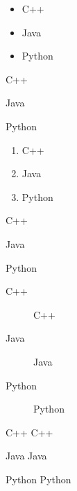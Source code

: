 \documentclass[12pt]{article}
\begin{document}
        \renewcommand{\labelitemi}{*}   %
        \renewcommand{\theenumi}{\Roman{enumi}} %
        \begin{itemize} %
            \item C++
            \item Java
            \item Python
        \end{itemize}
        \begin{compactitem}
            \item C++
            \item Java
            \item Python
        \end{compactitem}  
                
        \begin{enumerate}
            \item C++
            \item Java
            \item Python
        \end{enumerate}
        \begin{compactenum}
            \item C++
            \item Java
            \item Python
        \end{compactenum}
                
        \begin{description}
            \item[C++] C++
            \item[Java] Java
            \item[Python] Python
        \end{description}
        \begin{compactdesc}
            \item[C++] C++
            \item[Java] Java
            \item[Python] Python
        \end{compactdesc}  
\end{document}
